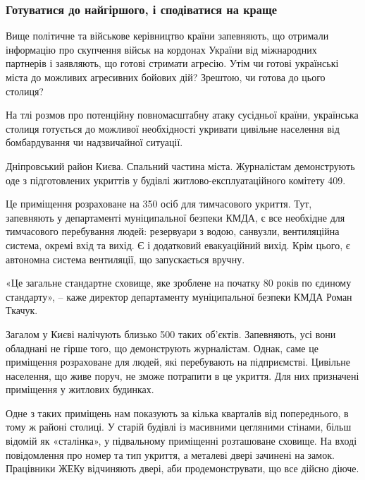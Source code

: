 \subsubsection{Готуватися до найгіршого, і сподіватися на краще}

Вище політичне та військове керівництво країни запевняють, що отримали
інформацію про скупчення військ на кордонах України від міжнародних партнерів і
заявляють, що готові стримати агресію. Утім чи готові українські міста до
можливих агресивних бойових дій? Зрештою, чи готова до цього столиця?

На тлі розмов про потенційну повномасштабну атаку сусідньої країни, українська
столиця готується до можливої необхідності укривати цивільне населення від
бомбардування чи надзвичайної ситуації.


Дніпровський район Києва. Спальний частина міста. Журналістам демонструють оде
з підготовлених укриттів у будівлі житлово-експлуатаційного комітету 409.

Це приміщення розраховане на 350 осіб для тимчасового укриття. Тут, запевняють
у департаменті муніципальної безпеки КМДА, є все необхідне для тимчасового
перебування людей: резервуари з водою, санвузли, вентиляційна система, окремі
вхід та вихід. Є і додатковий евакуаційний вихід. Крім цього, є автономна
система вентиляції, що запускається вручну.

«Це загальне стандартне сховище, яке зроблене на початку 80 років по єдиному
стандарту», – каже директор департаменту муніципальної безпеки КМДА Роман
Ткачук.

Загалом у Києві налічують близько 500 таких об'єктів. Запевняють, усі вони
обладнані не гірше того, що демонструють журналістам. Однак, саме це приміщення
розраховане для людей, які перебувають на підприємстві. Цивільне населення, що
живе поруч, не зможе потрапити в це укриття. Для них призначені приміщення у
житлових будинках.


Одне з таких приміщень нам показують за кілька кварталів від попереднього, в
тому ж районі столиці. У старій будівлі із масивними цегляними стінами, більш
відомій як «сталінка», у підвальному приміщенні розташоване сховище. На вході
повідомлення про номер та тип укриття, а металеві двері зачинені на замок.
Працівники ЖЕКу відчиняють двері, аби продемонструвати, що все дійсно діюче.

